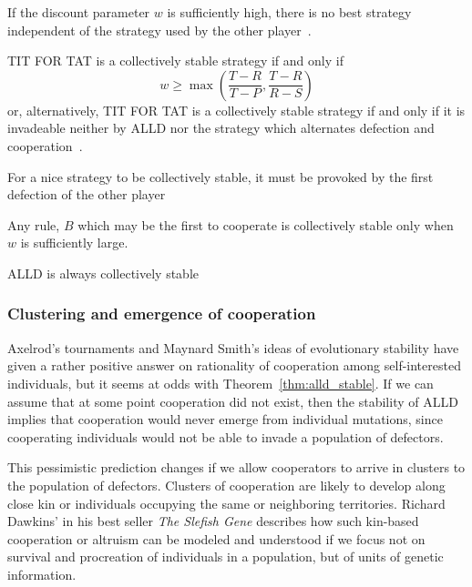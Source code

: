 \begin{theorem}
If the discount parameter $w$ is sufficiently high, there is no best strategy independent of the strategy used by the other player~\cite[Theorem 1]{RobertAxelrod_1981}.
\end{theorem}

\begin{theorem}
TIT FOR TAT is a collectively stable strategy if and only if
\[
w \geq \max \left( \frac{T-R}{T-P}, \frac{T-R}{R-S}\right)
\]
or, alternatively, TIT FOR TAT is a collectively stable strategy if and only if it is invadeable neither by ALLD nor the strategy which alternates defection and cooperation~\cite[Theorem 2]{RobertAxelrod_1981}.
\end{theorem}

\begin{theorem}
For a nice strategy to be collectively stable, it must be provoked by the first defection of the other player~\cite[Theorem 4]{RobertAxelrod_1981}
\end{theorem}

\begin{theorem}
Any rule, $B$ which may be the first to cooperate is collectively stable only when $w$ is sufficiently large.~\cite[Theorem 5]{RobertAxelrod_1981}
\end{theorem}

\begin{theorem}\label{thm:alld_stable}
ALLD is always collectively stable~\cite[Theorem 6]{RobertAxelrod_1981}
\end{theorem}


\subsubsection{Clustering and emergence of cooperation}
Axelrod's tournaments and Maynard Smith's ideas of evolutionary stability have given a rather positive answer on rationality of cooperation among self-interested individuals, but it seems at odds with Theorem~\ref{thm:alld_stable}. If we can assume that at some point cooperation did not exist, then the stability of ALLD implies that cooperation would never emerge from individual mutations, since cooperating individuals would not be able to invade a population of defectors.

This pessimistic prediction changes if we allow cooperators to arrive in clusters to the population of defectors. Clusters of cooperation are likely to develop along close kin or individuals occupying the same or neighboring territories. Richard Dawkins' in his best seller \textit{The Slefish Gene}\cite{dawkins2006selfish} describes how such kin-based cooperation or altruism can be modeled and understood if we focus not on survival and procreation of individuals in a population, but of units of genetic information.

